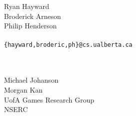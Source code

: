 { \\ \ \\

Ryan Hayward  \\
Broderick Arneson \\
Philip Henderson \\ \ \\
\verb+{hayward,broderic,ph}@cs.ualberta.ca+
\ecen}

\vsp{1.5in}

{ \\ \ \\

Michael Johanson\\
Morgan Kan\\
UofA Games Research Group \\
NSERC \\
\ecen}
